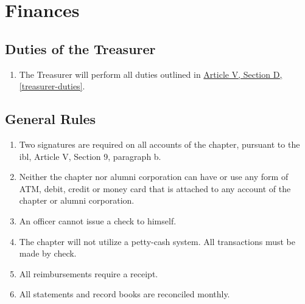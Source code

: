 \chapter{Finances}

\section{Duties of the Treasurer}
	\begin{enumerate}
		\item The Treasurer will perform all duties outlined in \hyperref[treasurer-duties]{Article V, Section D, \autoref*{treasurer-duties}}. 
	\end{enumerate}

\section{General Rules}
	\label{fin-rules}
	\begin{enumerate}
		\item Two signatures are required on all accounts of the chapter, pursuant to the \gls{ibl}, Article V, Section 9, paragraph b.
		\item Neither the chapter nor alumni corporation can have or use any form of ATM, debit, credit or money card that is attached to any account of the chapter or alumni corporation.
		\item An officer cannot issue a check to himself.
		\item The chapter will not utilize a petty-cash system. All transactions must be made by
		check.
		\item All reimbursements require a receipt.
		\item All statements and record books are reconciled monthly.
	\end{enumerate}

